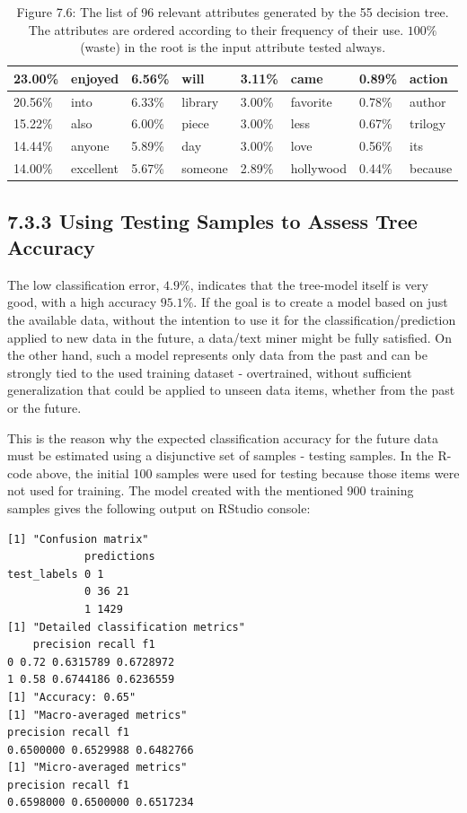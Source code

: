 \documentclass[10pt]{book}
\begin{document}
\begin{table}[h]
\begin{center}
\begin{tabular}{|l|l|l|l|l|l|l|l|}
\hline
23.00\% & enjoyed & 6.56\% & will & 3.11\% & came & 0.89\% & action \\
\hline
20.56\% & into & 6.33\% & library & 3.00\% & favorite & 0.78\% & author \\
\hline
15.22\% & also & 6.00\% & piece & 3.00\% & less & 0.67\% & trilogy \\
\hline
14.44\% & anyone & 5.89\% & day & 3.00\% & love & 0.56\% & its \\
\hline
14.00\% & excellent & 5.67\% & someone & 2.89\% & hollywood & 0.44\% & because \\
\hline
\end{tabular}
\captionsetup{labelformat=empty}
\caption{Figure 7.6: The list of 96 relevant attributes generated by the 55 decision tree. The attributes are ordered according to their frequency of their use. $100 \%$ (waste) in the root is the input attribute tested always.}
\end{center}
\end{table}

\subsection*{7.3.3 Using Testing Samples to Assess Tree Accuracy}
The low classification error, $4.9 \%$, indicates that the tree-model itself is very good, with a high accuracy $95.1 \%$. If the goal is to create a model based on just the available data, without the intention to use it for the classification/prediction applied to new data in the future, a data/text miner might be fully satisfied. On the other hand, such a model represents only data from the past and can be strongly tied to the used training dataset - overtrained, without sufficient generalization that could be applied to unseen data items, whether from the past or the future.

This is the reason why the expected classification accuracy for the future data must be estimated using a disjunctive set of samples - testing samples. In the R-code above, the initial 100 samples were used for testing because those items were not used for training. The model created with the mentioned 900 training samples gives the following output on RStudio console:

\begin{verbatim}
[1] "Confusion matrix"
            predictions
test_labels 0 1
            0 36 21
            1 1429
[1] "Detailed classification metrics"
    precision recall f1
0 0.72 0.6315789 0.6728972
1 0.58 0.6744186 0.6236559
[1] "Accuracy: 0.65"
[1] "Macro-averaged metrics"
precision recall f1
0.6500000 0.6529988 0.6482766
[1] "Micro-averaged metrics"
precision recall f1
0.6598000 0.6500000 0.6517234
\end{verbatim}
\end{document}
